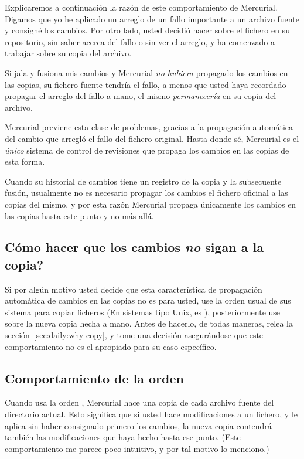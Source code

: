 Explicaremos a continuación la razón de este comportamiento de
Mercurial. Digamos que yo he aplicado un arreglo de un fallo importante a un
archivo fuente y consigné los cambios.  Por otro lado, usted decidió hacer
 sobre el fichero en su repositorio, sin saber acerca del
fallo o sin ver el arreglo, y ha comenzado a trabajar sobre su copia
del archivo.

Si jala y fusiona mis cambios y Mercurial \emph{no hubiera} propagado
los cambios en las copias, su fichero fuente tendría el fallo, a menos
que usted haya recordado propagar el arreglo del fallo a mano, el
mismo \emph{permanecería} en su copia del archivo.

Mercurial previene esta clase de problemas, gracias a la propagación
automática del cambio que arregló el fallo del fichero original. Hasta
donde sé, Mercurial es el \emph{único} sistema de control de
revisiones que propaga los cambios en las copias de esta forma.

Cuando su historial de cambios tiene un registro de la copia y la
subsecuente fusión, usualmente no es necesario propagar los cambios el
fichero oficinal a las copias del mismo, y por esta razón Mercurial
propaga únicamente los cambios en las copias hasta este punto y no más
allá.


\subsection{Cómo hacer que los cambios \emph{no} sigan a la copia?}

Si por algún motivo usted decide que esta característica de
propagación automática de cambios en las copias no es para usted, use
la orden usual de sus sistema para copiar ficheros (En sistemas tipo
Unix, es ), posteriormente use  sobre la nueva
copia hecha a mano.  Antes de hacerlo, de todas maneras, relea la
sección~\ref{sec:daily:why-copy}, y tome una decisión asegurándose que
este comportamiento no es el apropiado para su caso específico.

\subsection{Comportamiento de la orden }

Cuando usa la orden , Mercurial hace una copia de cada
archivo fuente del directorio actual. Esto significa que si usted hace
modificaciones a un fichero, y le aplica  sin haber
consignado primero los cambios, la nueva copia contendrá también las
modificaciones que haya hecho hasta ese punto. (Este comportamiento me
parece poco intuitivo, y por tal motivo lo menciono.)

